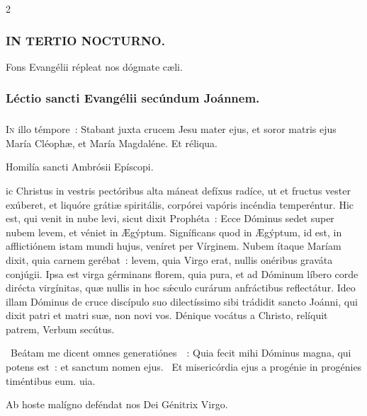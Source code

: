 \documentclass[9pt,twoside]{extarticle}
\begin{document}
\begin{multicols}{2}
{\subsubsection*{\center \textsc{IN TERTIO NOCTURNO.}}
\begin{tightlist}{}
\item {\small {} Fons Evangélii répleat nos dógmate cæli.}
\end{tightlist}
\subsubsection*{\center Léctio sancti Evangélii secúndum Joánnem.}
\subsubsection*{\center {}}
\lettrine{I}n illo témpore~: Stabant juxta crucem Jesu mater ejus, et soror matris ejus María Cléophæ, et María Magdaléne. Et réliqua.

\begin{center}Homilía sancti Ambrósii Epíscopi.\\
\end{center}
ic Christus in vestris pectóribus alta máneat defíxus radíce, ut et fructus vester exúberet, et liquóre grátiæ spiritális, corpórei vapóris incéndia temperéntur. Hic est, qui venit in nube levi, sicut dixit Prophéta~: Ecce Dóminus sedet super nubem levem, et véniet in Ægýptum. Signíficans quod in Ægýptum, id est, in afflictiónem istam mundi hujus, veníret per Vírginem. Nubem ítaque Maríam dixit, quia carnem gerébat~: levem, quia Virgo erat, nullis onéribus graváta conjúgii. Ipsa est virga gérminans florem, quia pura, et ad Dóminum líbero corde dirécta virgínitas, quæ nullis in hoc sǽculo curárum anfráctibus reflectátur. Ideo illam Dóminus de cruce discípulo suo dilectíssimo sibi trádidit sancto Joánni, qui dixit patri et matri suæ, non novi vos. Dénique vocátus a Christo, relíquit patrem, Verbum secútus.

\begin{tightlist}{}
\item {}~Beátam me dicent omnes generatiónes~~: \textred{*} Quia fecit mihi Dóminus magna, qui potens est~: et sanctum nomen ejus.
~Et misericórdia ejus a progénie in progénies timéntibus eum. uia.
\item {\small {} Ab hoste malígno deféndat nos Dei Génitrix Virgo.}
\end{tightlist}

}
\end{multicols}
\end{document}
